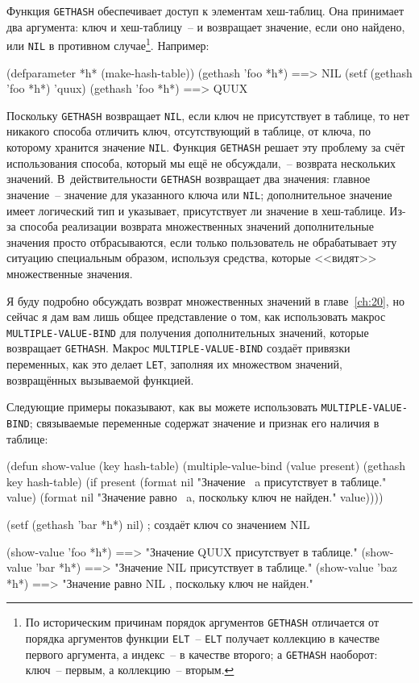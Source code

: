 Функция \lstinline{GETHASH} обеспечивает доступ к элементам хеш-таблиц.  Она принимает два
аргумента: ключ и хеш-таблицу~-- и возвращает значение, если оно найдено, или \lstinline{NIL} в
противном случае\footnote{По историческим причинам порядок аргументов \lstinline{GETHASH}
  отличается от порядка аргументов функции \lstinline{ELT}~-- \lstinline{ELT} получает коллекцию в
  качестве первого аргумента, а индекс~-- в качестве второго; а \lstinline{GETHASH} наоборот:
  ключ~-- первым, а коллекцию~-- вторым.}\hspace{\footnotenegspace}.  Например:

\begin{myverb}
(defparameter *h* (make-hash-table))
(gethash 'foo *h*) ==> NIL
(setf (gethash 'foo *h*) 'quux)
(gethash 'foo *h*) ==> QUUX
\end{myverb}

Поскольку \lstinline{GETHASH} возвращает \lstinline{NIL}, если ключ не присутствует в таблице, то нет
никакого способа отличить ключ, отсутствующий в таблице, от ключа, по которому хранится
значение \lstinline{NIL}.  Функция \lstinline{GETHASH} решает эту проблему за счёт использования
способа, который мы ещё не обсуждали,~-- возврата нескольких значений.  В~действительности
\lstinline{GETHASH} возвращает два значения: главное значение~-- значение для указанного ключа
или \lstinline{NIL};  дополнительное значение имеет логический тип и указывает, присутствует ли
значение в хеш-таблице.  Из-за способа реализации возврата множественных значений
дополнительные значения просто отбрасываются, если только пользователь не обрабатывает эту
ситуацию специальным образом, используя средства, которые <<видят>> множественные значения.

Я буду подробно обсуждать возврат множественных значений в главе~\ref{ch:20}, но сейчас я
дам вам лишь общее представление о том, как использовать макрос \lstinline{MULTIPLE-VALUE-BIND}
для получения дополнительных значений, которые возвращает \lstinline{GETHASH}.  Макрос
\lstinline{MULTIPLE-VALUE-BIND} создаёт привязки переменных, как это делает \lstinline{LET},
заполняя их множеством значений, возвращённых вызываемой функцией.

Следующие примеры показывают, как вы можете использовать \lstinline{MULTIPLE-VALUE-BIND};
связываемые переменные содержат значение и признак его наличия в таблице:

\begin{myverb}  
(defun show-value (key hash-table)
  (multiple-value-bind (value present) (gethash key hash-table)
    (if present
      (format nil "Значение ~a присутствует в таблице." value)
      (format nil "Значение равно ~a, поскольку ключ не найден." value))))

(setf (gethash 'bar *h*) nil) ; создаёт ключ со значением NIL

(show-value 'foo *h*) ==> "Значение QUUX присутствует в таблице."
(show-value 'bar *h*) ==> "Значение NIL присутствует в таблице."
(show-value 'baz *h*) ==> "Значение равно NIL , поскольку ключ не найден."
\end{myverb}

